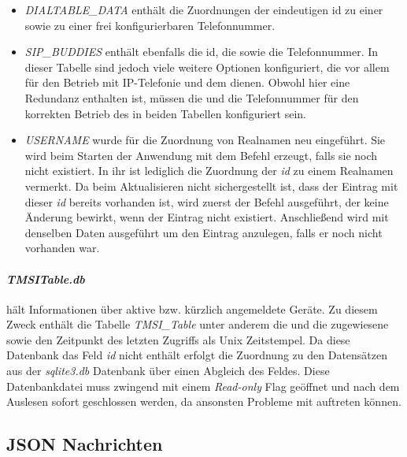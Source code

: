 \begin{itemize}
	\item \textit{DIALTABLE\_DATA} enthält die Zuordnungen der eindeutigen id zu einer \IMSI sowie zu einer frei konfigurierbaren Telefonnummer.
	
	\item \textit{SIP\_BUDDIES} enthält ebenfalls die id, die \IMSI sowie die Telefonnummer. In dieser Tabelle sind jedoch viele weitere Optionen konfiguriert, die vor allem für den Betrieb mit IP-Telefonie und dem \SIP dienen. Obwohl hier eine Redundanz enthalten ist, müssen die \IMSI und die Telefonnummer für den korrekten Betrieb des \OpenBTS in beiden Tabellen konfiguriert sein.
	
	\item \textit{USERNAME} wurde für die Zuordnung von Realnamen neu eingeführt. Sie wird beim Starten der Anwendung mit dem \SQL Befehl   erzeugt, falls sie noch nicht existiert. In ihr ist lediglich die Zuordnung der \textit{id} zu einem Realnamen vermerkt. Da beim Aktualisieren nicht sichergestellt ist, dass der Eintrag mit dieser \textit{id} bereits vorhanden ist, wird zuerst der Befehl  ausgeführt, der keine Änderung bewirkt, wenn der Eintrag nicht existiert. Anschließend wird  mit denselben Daten ausgeführt um den Eintrag anzulegen, falls er noch nicht vorhanden war.
\end{itemize}


\paragraph{\textit{TMSITable.db}} hält Informationen über aktive bzw. kürzlich angemeldete Geräte. Zu diesem Zweck enthält die Tabelle \textit{TMSI\_Table} unter anderem die \IMSI und die zugewiesene \TMSI sowie den Zeitpunkt des letzten Zugriffs als Unix Zeitstempel. Da diese Datenbank das Feld \textit{id} nicht enthält erfolgt die Zuordnung zu den Datensätzen aus der \textit{sqlite3.db} Datenbank über einen Abgleich des \IMSI Feldes. Diese Datenbankdatei muss zwingend mit einem \textit{Read-only} Flag geöffnet und nach dem Auslesen sofort geschlossen werden, da ansonsten Probleme mit \OpenBTS auftreten können.

\subsection{JSON Nachrichten}
\label{subsec:json}

